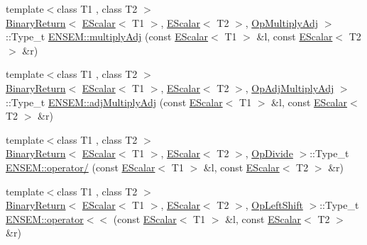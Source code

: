 \begin{DoxyCompactItemize}
\item 
{\footnotesize template$<$class T1 , class T2 $>$ }\\\mbox{\hyperlink{structENSEM_1_1BinaryReturn}{Binary\+Return}}$<$ \mbox{\hyperlink{classENSEM_1_1EScalar}{E\+Scalar}}$<$ T1 $>$, \mbox{\hyperlink{classENSEM_1_1EScalar}{E\+Scalar}}$<$ T2 $>$, \mbox{\hyperlink{structENSEM_1_1OpMultiplyAdj}{Op\+Multiply\+Adj}} $>$\+::Type\+\_\+t \mbox{\hyperlink{group__escalar_ga90260817012914a08b2475f4cc5c94a7}{E\+N\+S\+E\+M\+::multiply\+Adj}} (const \mbox{\hyperlink{classENSEM_1_1EScalar}{E\+Scalar}}$<$ T1 $>$ \&l, const \mbox{\hyperlink{classENSEM_1_1EScalar}{E\+Scalar}}$<$ T2 $>$ \&r)
\item 
{\footnotesize template$<$class T1 , class T2 $>$ }\\\mbox{\hyperlink{structENSEM_1_1BinaryReturn}{Binary\+Return}}$<$ \mbox{\hyperlink{classENSEM_1_1EScalar}{E\+Scalar}}$<$ T1 $>$, \mbox{\hyperlink{classENSEM_1_1EScalar}{E\+Scalar}}$<$ T2 $>$, \mbox{\hyperlink{structENSEM_1_1OpAdjMultiplyAdj}{Op\+Adj\+Multiply\+Adj}} $>$\+::Type\+\_\+t \mbox{\hyperlink{group__escalar_gab3c0c146aa415c32cb9ce5a6ad426d10}{E\+N\+S\+E\+M\+::adj\+Multiply\+Adj}} (const \mbox{\hyperlink{classENSEM_1_1EScalar}{E\+Scalar}}$<$ T1 $>$ \&l, const \mbox{\hyperlink{classENSEM_1_1EScalar}{E\+Scalar}}$<$ T2 $>$ \&r)
\item 
{\footnotesize template$<$class T1 , class T2 $>$ }\\\mbox{\hyperlink{structENSEM_1_1BinaryReturn}{Binary\+Return}}$<$ \mbox{\hyperlink{classENSEM_1_1EScalar}{E\+Scalar}}$<$ T1 $>$, \mbox{\hyperlink{classENSEM_1_1EScalar}{E\+Scalar}}$<$ T2 $>$, \mbox{\hyperlink{structENSEM_1_1OpDivide}{Op\+Divide}} $>$\+::Type\+\_\+t \mbox{\hyperlink{group__escalar_ga6afeb39f3b92a8cfc99b5dc1689d0488}{E\+N\+S\+E\+M\+::operator/}} (const \mbox{\hyperlink{classENSEM_1_1EScalar}{E\+Scalar}}$<$ T1 $>$ \&l, const \mbox{\hyperlink{classENSEM_1_1EScalar}{E\+Scalar}}$<$ T2 $>$ \&r)
\item 
{\footnotesize template$<$class T1 , class T2 $>$ }\\\mbox{\hyperlink{structENSEM_1_1BinaryReturn}{Binary\+Return}}$<$ \mbox{\hyperlink{classENSEM_1_1EScalar}{E\+Scalar}}$<$ T1 $>$, \mbox{\hyperlink{classENSEM_1_1EScalar}{E\+Scalar}}$<$ T2 $>$, \mbox{\hyperlink{structENSEM_1_1OpLeftShift}{Op\+Left\+Shift}} $>$\+::Type\+\_\+t \mbox{\hyperlink{group__escalar_ga70b4aa1415cb636de9b4b0d56d26486b}{E\+N\+S\+E\+M\+::operator$<$$<$}} (const \mbox{\hyperlink{classENSEM_1_1EScalar}{E\+Scalar}}$<$ T1 $>$ \&l, const \mbox{\hyperlink{classENSEM_1_1EScalar}{E\+Scalar}}$<$ T2 $>$ \&r)

\end{DoxyCompactItemize}
